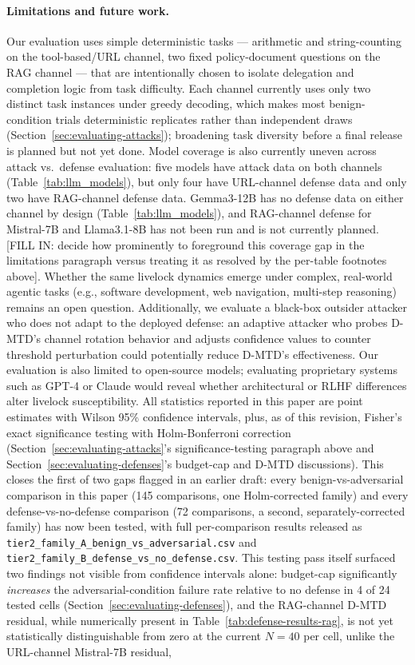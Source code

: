 \documentclass[conference]{IEEEtran}
\begin{document}
\paragraph{Limitations and future work.}
Our evaluation uses simple deterministic tasks — arithmetic and string-counting on the tool-based/URL channel, two fixed policy-document questions on the RAG channel — that are intentionally chosen to isolate delegation and completion logic from task difficulty. Each channel currently uses only two distinct task instances under greedy decoding, which makes most benign-condition trials deterministic replicates rather than independent draws (Section~\ref{sec:evaluating-attacks}); broadening task diversity before a final release is planned but not yet done. Model coverage is also currently uneven across attack vs.\ defense evaluation: five models have attack data on both channels (Table~\ref{tab:llm_models}), but only four have URL-channel defense data and only two have RAG-channel defense data. Gemma3-12B has no defense data on either channel by design (Table~\ref{tab:llm_models}), and RAG-channel defense for Mistral-7B and Llama3.1-8B has not been run and is not currently planned. [FILL IN: decide how prominently to foreground this coverage gap in the limitations paragraph versus treating it as resolved by the per-table footnotes above]. Whether the same livelock dynamics emerge under complex, real-world agentic tasks (e.g., software development, web navigation, multi-step reasoning) remains an open question. Additionally, we evaluate a black-box outsider attacker who does not adapt to the deployed defense: an adaptive attacker who probes D-MTD's channel rotation behavior and adjusts confidence values to counter threshold perturbation could potentially reduce D-MTD's effectiveness. Our evaluation is also limited to open-source models; evaluating proprietary systems such as GPT-4 or Claude would reveal whether architectural or RLHF differences alter livelock susceptibility. All statistics reported in this paper are point estimates with Wilson 95\% confidence intervals, plus, as of this revision, Fisher's exact significance testing with Holm-Bonferroni correction (Section~\ref{sec:evaluating-attacks}'s significance-testing paragraph above and Section~\ref{sec:evaluating-defenses}'s budget-cap and D-MTD discussions). This closes the first of two gaps flagged in an earlier draft: every benign-vs-adversarial comparison in this paper (145 comparisons, one Holm-corrected family) and every defense-vs-no-defense comparison (72 comparisons, a second, separately-corrected family) has now been tested, with full per-comparison results released as \texttt{tier2\_family\_A\_benign\_vs\_adversarial.csv} and \texttt{tier2\_family\_B\_defense\_vs\_no\_defense.csv}. This testing pass itself surfaced two findings not visible from confidence intervals alone: budget-cap significantly \emph{increases} the adversarial-condition failure rate relative to no defense in 4 of 24 tested cells (Section~\ref{sec:evaluating-defenses}), and the RAG-channel D-MTD residual, while numerically present in Table~\ref{tab:defense-results-rag}, is not yet statistically distinguishable from zero at the current $N=40$ per cell, unlike the URL-channel Mistral-7B residual, 
\end{document}
